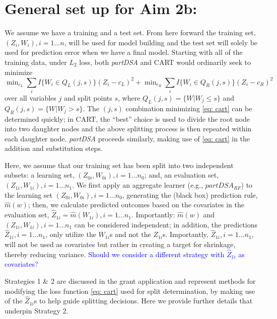 \documentclass[12pt]{article}
\begin{document}
\section{General set up for Aim 2b:}


We assume we have a training and a test set. From here forward the training set, $(Z_i,W_i), i = 1 \ldots n$, will be used for model building and the test set will solely be used for prediction error when we have a final model. Starting with all of the training data, under $L_2$ loss,
both \emph{partDSA} and CART would ordinarily seek to minimize
\begin{equation} \label{eq: cart}
	\min\nolimits_{c_L} {\textstyle \sum\nolimits}_i I\{ W_{i} \in Q_{L}(j,s) \} (Z_{i}-c_L)^2
	+ \min\nolimits_{c_R} {\textstyle \sum\nolimits}_i
	I\{ W_{i} \in Q_{R}(j,s) \}
	(Z_{i}-c_R)^2
\end{equation}
over all variables $j$ and split points $s$, where
$Q_{L}(j,s) = \{W|W_{j} \leq s\}$ and $Q_{R}(j,s) = \{W|W_{j} >
s\}$.  %
The $(j,s)$ combination minimizing \eqref{eq: cart} can be determined
quickly; in CART, the ``best'' choice is used to divide the root node into
two daughter nodes and the above splitting process is then repeated
within each daughter node. \emph{partDSA} proceeds similarly, making use of \eqref{eq: cart} in the addition and substitution steps. 

Here, we assume that our training set has been split into two independent
subsets: a learning set, $(Z_{0i},W_{0i}), i = 1 \ldots n_0$; and, an evaluation set,
$(Z_{1i}, W_{1i}), i = 1 \ldots n_1$. We first apply an aggregate
learner (e.g., $partDSA_{RF}$) to the learning set $(Z_{0i}, W_{0i}),
i = 1 \ldots n_0$, generating the (black box) prediction rule,
$\hat{m}(w)$; then, we calculate predicted outcomes based on the covariates in the evaluation set,
$\widehat{Z}_{1i} = \hat{m}(W_{1i}), i = 1 \ldots n_1$.  Importantly:
$\hat{m}(w)$ and $(Z_{1i}, W_{1i}), i = 1 \ldots n_1$ can be
considered independent; in addition, the predictions
$\widehat{Z}_{1i}, i = 1 \ldots n_1$, only utilize the $W_{1i}$s and not
the $Z_{1i}$s. Importantly, $\widehat{Z}_{1i}, i = 1 \ldots n_1$, will
not be used as covariates but rather in creating a target for
shrinkage, thereby reducing variance. \textcolor{blue}{Should we consider a different strategy with $\widehat{Z}_{1i}$ as covariates?}

 Strategies 1 \& 2 are
discussed in the grant application and represent methods for modifying
the loss function \eqref{eq: cart} used for split determination,
by making use of the $\widehat{Z}_{1i}$s to help guide splitting
decisions. Here we provide further details that underpin
Strategy 2.
\end{document}
